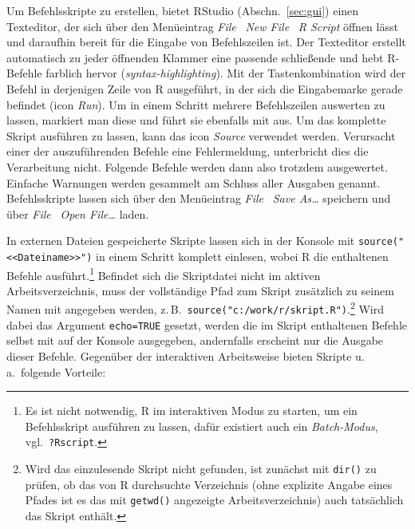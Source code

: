 Um Befehlsskripte zu erstellen, bietet RStudio (Abschn.\ \ref{sec:gui}) einen Texteditor, der sich über den Menüeintrag \emph{File} \textrightarrow\ \emph{New File} \textrightarrow\ \emph{R Script} öffnen lässt und daraufhin bereit für die Eingabe von Befehlszeilen ist. Der Texteditor erstellt automatisch zu jeder öffnenden Klammer eine passende schließende und hebt R-Befehle farblich hervor (\emph{syntax-highlighting}). Mit der Tastenkombination  wird der Befehl in derjenigen Zeile von R ausgeführt, in der sich die Eingabemarke gerade befindet (icon \emph{Run}). Um in einem Schritt mehrere Befehlszeilen auswerten zu lassen, markiert man diese und führt sie ebenfalls mit  aus. Um das komplette Skript ausführen zu lassen, kann das icon \emph{Source} verwendet werden. Verursacht einer der auszuführenden Befehle eine Fehlermeldung, unterbricht dies die Verarbeitung nicht. Folgende Befehle werden dann also trotzdem ausgewertet. Einfache Warnungen werden gesammelt am Schluss aller Ausgaben genannt. Befehlsskripte lassen sich über den Menüeintrag \emph{File} \textrightarrow\ \emph{Save As\ldots} speichern und über \emph{File} \textrightarrow\ \emph{Open File\ldots} laden.

In externen Dateien gespeicherte Skripte lassen sich in der Konsole mit \lstinline!source("<<Dateiname>>")! in einem Schritt komplett einlesen, wobei R die enthaltenen Befehle ausführt.\footnote{Es ist nicht notwendig, R im interaktiven Modus zu starten, um ein Befehlsskript ausführen zu lassen, dafür existiert auch ein \emph{Batch-Modus}, vgl.\ \lstinline!?Rscript!.} Befindet sich die Skriptdatei nicht im aktiven Arbeitsverzeichnis, muss der vollständige Pfad zum Skript zusätzlich zu seinem Namen mit angegeben werden, z.\,B.\ \lstinline!source("c:/work/r/skript.R")!.\footnote{Wird das einzulesende Skript nicht gefunden, ist zunächst mit \lstinline!dir()! zu prüfen, ob das von R durchsuchte Verzeichnis (ohne explizite Angabe eines Pfades ist es das mit \lstinline!getwd()! angezeigte Arbeitsverzeichnis) auch tatsächlich das Skript enthält.} Wird dabei das Argument \lstinline!echo=TRUE! gesetzt, werden die im Skript enthaltenen Befehle selbst mit auf der Konsole ausgegeben, andernfalls erscheint nur die Ausgabe dieser Befehle. Gegenüber der interaktiven Arbeitsweise bieten Skripte u.\,a.\ folgende Vorteile:

